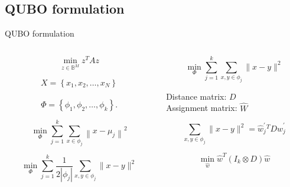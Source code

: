 \subsection{QUBO formulation}
	\begin{frame}{QUBO formulation}
		\begin{columns}
			\begin{column}{0.5\textwidth}
				$$\min _{z \in \mathbb{B}^{M}} z^{T} A z$$

				$$X=\left\{x_{1}, x_{2}, \ldots, x_{N}\right\}$$\\$$\Phi=\left\{\phi_{1}, \phi_{2}, \ldots, \phi_{k}\right\} .$$

				$$\min _{\Phi} \sum_{j=1}^{k} \sum_{x \in \phi_{j}}\left\|x-\mu_{j}\right\|^{2}$$

				$$\min _{\Phi} \sum_{j=1}^{k} \frac{1}{2\left|\phi_{j}\right|} \sum_{x, y \in \phi_{j}}\|x-y\|^{2}$$

			\end{column}
			\begin{column}{0.5\textwidth}  
				$$\min _{\Phi} \sum_{j=1}^{k} \sum_{x, y \in \phi_{j}}\|x-y\|^{2}$$

				Distance matrix: $D$ \\Assignment matrix: $\hat W$

				$$\sum_{x, y \in \phi_{j}}\|x-y\|^{2}=\hat{w}^{\prime}_{j}^{T} D \hat{w}_{j}^{\prime}$$

				$$\min _{\hat{w}} \hat{w}^{T}\left(I_{k} \otimes D\right) \hat{w}$$
			\end{column}
		\end{columns}
	\end{frame}

